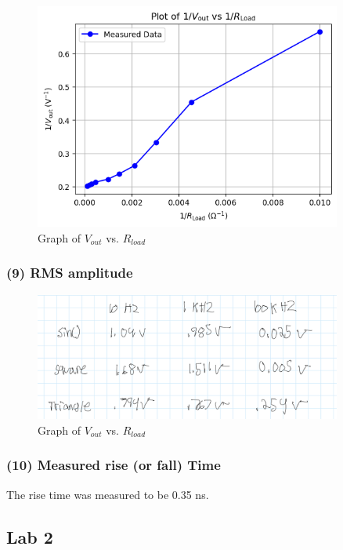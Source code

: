 \documentclass{article}
\begin{document}
    \begin{figure}[H]
        \centering
        \includegraphics[width=0.9\textwidth]{img/Lab1_8a.png}  
        \caption{Graph of $V_{out}$ vs. $R_{load}$}
        \label{fig:Derived Voltage Formula Graphs}
    \end{figure}

    \subsubsection{(9) RMS amplitude }
    \begin{figure}[H]
        \centering
        \includegraphics[width=0.9\textwidth]{img/Lab1_9.png}  
        \caption{Graph of $V_{out}$ vs. $R_{load}$}
        \label{fig:RMS amplitude}
    \end{figure}

    \subsubsection{(10) Measured rise (or fall) Time }
    The rise time was measured to be 0.35 ns.

\begin{center}
    \section*{Lab 2}
\end{center}
\end{document}
